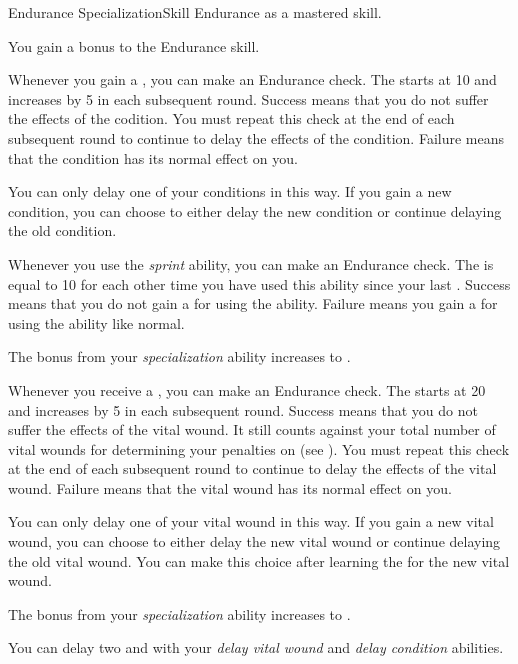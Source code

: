    \begin{feat}{Endurance Specialization}{Skill}
        \featpre Endurance as a mastered skill.

         You gain a  bonus to the Endurance skill.

         Whenever you gain a , you can make an Endurance check.
        The  starts at 10 and increases by 5 in each subsequent round.
        Success means that you do not suffer the effects of the codition.
        You must repeat this check at the end of each subsequent round to continue to delay the effects of the condition.
        Failure means that the condition has its normal effect on you.

        You can only delay one of your conditions in this way.
        If you gain a new condition, you can choose to either delay the new condition or continue delaying the old condition.

         Whenever you use the \textit{sprint} ability, you can make an Endurance check.
        The  is equal to 10  for each other time you have used this ability since your last .
        Success means that you do not gain a  for using the ability.
        Failure means you gain a  for using the ability like normal.

         The bonus from your \textit{specialization} ability increases to .

         Whenever you receive a , you can make an Endurance check.
        The  starts at 20 and increases by 5 in each subsequent round.
        Success means that you do not suffer the effects of the vital wound.
        It still counts against your total number of vital wounds for determining your penalties on  (see ).
        You must repeat this check at the end of each subsequent round to continue to delay the effects of the vital wound.
        Failure means that the vital wound has its normal effect on you.

        You can only delay one of your vital wound in this way.
        If you gain a new vital wound, you can choose to either delay the new vital wound or continue delaying the old vital wound.
        You can make this choice after learning the  for the new vital wound.

         The bonus from your \textit{specialization} ability increases to .

         You can delay two  and  with your \textit{delay vital wound} and \textit{delay condition} abilities.
    \end{feat}

